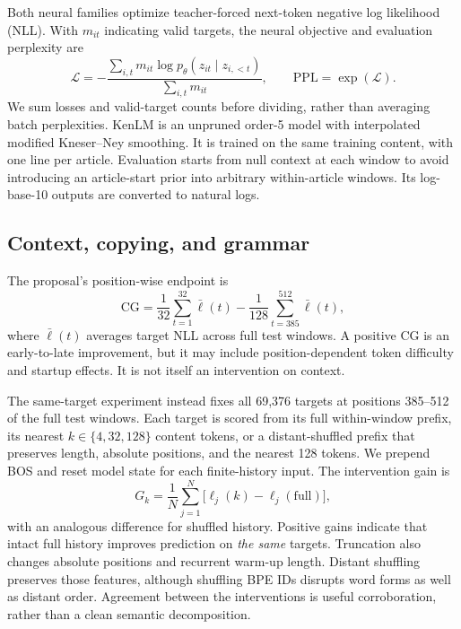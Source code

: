 \documentclass[10pt]{article}
\begin{document}
Both neural families optimize teacher-forced next-token negative log likelihood (NLL). With $m_{it}$ indicating valid targets, the neural objective and evaluation perplexity are
\begin{equation}
\mathcal{L}=-\frac{\sum_{i,t}m_{it}\log p_\theta(z_{it}\mid z_{i,<t})}{\sum_{i,t}m_{it}},
\qquad \mathrm{PPL}=\exp(\mathcal{L}).
\label{eq:loss}
\end{equation}
We sum losses and valid-target counts before dividing, rather than averaging batch perplexities. KenLM is an unpruned order-5 model with interpolated modified Kneser--Ney smoothing. It is trained on the same training content, with one line per article. Evaluation starts from null context at each window to avoid introducing an article-start prior into arbitrary within-article windows. Its log-base-10 outputs are converted to natural logs.

\subsection{Context, copying, and grammar}

The proposal's position-wise endpoint is
\begin{equation}
\mathrm{CG}=\frac{1}{32}\sum_{t=1}^{32}\bar\ell(t)
-\frac{1}{128}\sum_{t=385}^{512}\bar\ell(t),
\label{eq:cg}
\end{equation}
where $\bar\ell(t)$ averages target NLL across full test windows. A positive CG is an early-to-late improvement, but it may include position-dependent token difficulty and startup effects. It is not itself an intervention on context.

The same-target experiment instead fixes all 69,376 targets at positions 385--512 of the full test windows. Each target is scored from its full within-window prefix, its nearest $k\in\{4,32,128\}$ content tokens, or a distant-shuffled prefix that preserves length, absolute positions, and the nearest 128 tokens. We prepend BOS and reset model state for each finite-history input. The intervention gain is
\begin{equation}
G_k=\frac1N\sum_{j=1}^N\bigl[\ell_j(k)-\ell_j(\mathrm{full})\bigr],
\label{eq:intervention}
\end{equation}
with an analogous difference for shuffled history. Positive gains indicate that intact full history improves prediction on \emph{the same} targets. Truncation also changes absolute positions and recurrent warm-up length. Distant shuffling preserves those features, although shuffling BPE IDs disrupts word forms as well as distant order. Agreement between the interventions is useful corroboration, rather than a clean semantic decomposition.
\end{document}
